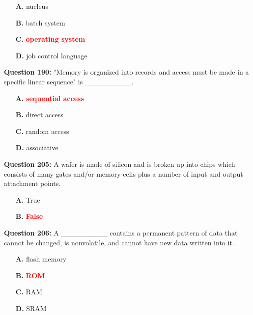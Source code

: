 \documentclass[12pt,a4paper]{article}
\begin{document}
\begin{itemize}
    \item[\textbf{A.}] nucleus
    \item[\textbf{B.}] batch system
    \item[\textbf{C.}] \textcolor{red}{\textbf{operating system}}
    \item[\textbf{D.}] job control language
\end{itemize}

\vspace{0.5cm}

\textbf{Question 190:} "Memory is organized into records and access must be made in a specific linear sequence" is _________.

\begin{itemize}
    \item[\textbf{A.}] \textcolor{red}{\textbf{sequential access}}
    \item[\textbf{B.}] direct access
    \item[\textbf{C.}] random access
    \item[\textbf{D.}] associative
\end{itemize}

\vspace{0.5cm}

\textbf{Question 205:} A wafer is made of silicon and is broken up into chips which consists of many gates and/or memory cells plus a number of input and output attachment points.

\begin{itemize}
    \item[\textbf{A.}] True
    \item[\textbf{B.}] \textcolor{red}{\textbf{False}}
\end{itemize}

\vspace{0.5cm}

\textbf{Question 206:} A _________ contains a permanent pattern of data that cannot be changed, is nonvolatile, and cannot have new data written into it.

\begin{itemize}
    \item[\textbf{A.}] flash memory
    \item[\textbf{B.}] \textcolor{red}{\textbf{ROM}}
    \item[\textbf{C.}] RAM
    \item[\textbf{D.}] SRAM
\end{itemize}
\end{document}
